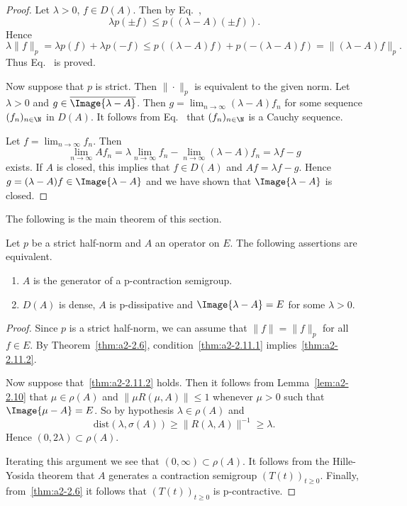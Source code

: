 \begin{proof}
Let $\lambda > 0$, $f \in D(A)$.
Then by Eq.~, 
%
\[
	\lambda p(\pm f) \leq p((\lambda - A)(\pm f)) .
\]
%
Hence 
\[
\lambda \|f\|_{p} = \lambda p(f) + \lambda p(-f) \leq p((\lambda - A)f) + p(-(\lambda-A)f) = \|(\lambda-A)f\|_{p}.
\]
Thus Eq.~ is proved.

Now suppose that $p$ is strict.
Then $\|\cdot\|_{p}$ is equivalent to the given norm.
Let $\lambda > 0$ and $g \in \overline{\Image{\lambda - A}}$.
Then $g = \lim_{n\to\infty} (\lambda - A)f_{n}$ for some sequence $(f_{n})_{n \in \N} $ in $D(A)$.
It follows from Eq.~ that $(f_{n})_{n\in\N}$ is a Cauchy sequence.

Let $f = \lim_{n\to\infty} f_{n}$.
Then 
\[
\lim_{n\to\infty} Af_{n} 
= \lambda\lim_{n\to\infty} f_{n} - \lim_{n\to\infty} (\lambda - A)f_{n} = \lambda f - g
\]
exists.
If\/ $A$ is closed, this implies that $f \in D(A)$ and $Af = \lambda f - g$.
Hence $g = (\lambda - A)f \in \Image{\lambda - A}$ and we have shown that $\Image{\lambda - A}$ is closed.
\end{proof}
The following is the main theorem of this section.
\begin{theorem}\label{thm:a2-2.11}
Let $p$ be a strict half-norm and $A$ an operator on $E$.
The following assertions are equivalent.
\begin{enumerate}[\upshape (a)]
\item \label{thm:a2-2.11.1}
$A$ is the generator of a p-contraction semigroup.
\item \label{thm:a2-2.11.2}
$D(A)$ is dense, $A$ is p-dissipative and $\Image{\lambda - A} = E$ for some $\lambda > 0$.
\end{enumerate}
\end{theorem}
\begin{proof}
Since $p$ is a strict half-norm, we can assume that $\|f\| = \|f\|_{p}$ for all $f \in E$.
By Theorem~\ref{thm:a2-2.6}, condition~\ref{thm:a2-2.11.1} implies~\ref{thm:a2-2.11.2}. 

Now suppose that~\ref{thm:a2-2.11.2}  holds.
Then it follows from Lemma~\ref{lem:a2-2.10}   
that $\mu \in \rho(A)$ and $\|\mu R(\mu,A)\| \leq 1$ whenever $\mu > 0$ such that $\Image{\mu-A} = E$.
So by hypothesis $\lambda \in \rho(A)$ and 
%
\[
	\mathrm{dist}(\lambda,\sigma(A)) \geq \|R(\lambda,A)\|^{-1} \geq \lambda .
\]
%
Hence $(0,2\lambda) \subset \rho(A)$.

Iterating this argument we see that $(0,\infty) \subset \rho(A)$.
It follows from the Hille-Yosida theorem that $A$ generates a contraction semigroup $(T(t))_{t\geq 0}$.
Finally, from~\ref{thm:a2-2.6} it follows that $(T(t))_{t\geq 0}$ is p-contractive.
\end{proof}
